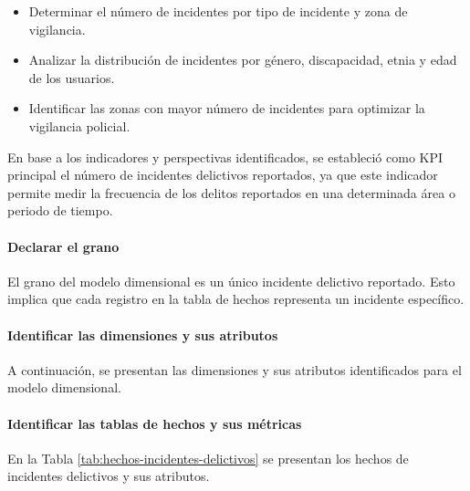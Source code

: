 \begin{itemize}
    \item Determinar el número de incidentes por tipo de incidente y zona de vigilancia.
    \item Analizar la distribución de incidentes por género, discapacidad, etnia y edad de los usuarios.
    \item Identificar las zonas con mayor número de incidentes para optimizar la vigilancia policial.
\end{itemize}



En base a los indicadores y perspectivas identificados, se estableció como KPI principal el número de incidentes
delictivos reportados, ya que este indicador permite medir la frecuencia de los delitos reportados en una determinada
área o periodo de tiempo.

\paragraph{Declarar el grano}

El grano del modelo dimensional es un único incidente delictivo reportado. Esto implica que cada registro en la
tabla de hechos representa un incidente específico.

\paragraph{Identificar las dimensiones y sus atributos}

A continuación, se presentan las dimensiones y sus atributos identificados para el modelo dimensional.




\paragraph{Identificar las tablas de hechos y sus métricas}

En la Tabla \ref{tab:hechos-incidentes-delictivos} se presentan los hechos de incidentes delictivos y sus atributos.

